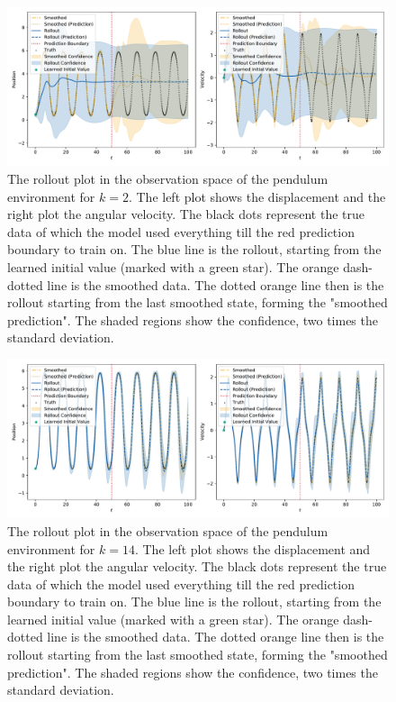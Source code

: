 		\begin{figure}
			\centering
			\includegraphics[width=\linewidth]{figures/results/pendulum/run-latent-dim-02/rollout-observations-N0.pdf}
			\caption{The rollout plot in the observation space of the pendulum environment for \(k = 2\). The left plot shows the displacement and the right plot the angular velocity. The black dots represent the true data of which the model used everything till the red prediction boundary to train on. The blue line is the rollout, starting from the learned initial value (marked with a green star). The orange dash-dotted line is the smoothed data. The dotted orange line then is the rollout starting from the last smoothed state, forming the "smoothed prediction". The shaded regions show the confidence, \ie two times the standard deviation.}
			\label{fig:pendulumRolloutL02}
		\end{figure}

		\begin{figure}
			\centering
			\includegraphics[width=\linewidth]{figures/results/pendulum/run-latent-dim-14/rollout-observations-N0.pdf}
			\caption{The rollout plot in the observation space of the pendulum environment for \(k = 14\). The left plot shows the displacement and the right plot the angular velocity. The black dots represent the true data of which the model used everything till the red prediction boundary to train on. The blue line is the rollout, starting from the learned initial value (marked with a green star). The orange dash-dotted line is the smoothed data. The dotted orange line then is the rollout starting from the last smoothed state, forming the "smoothed prediction". The shaded regions show the confidence, \ie two times the standard deviation.}
			\label{fig:pendulumRolloutL14}
		\end{figure}

